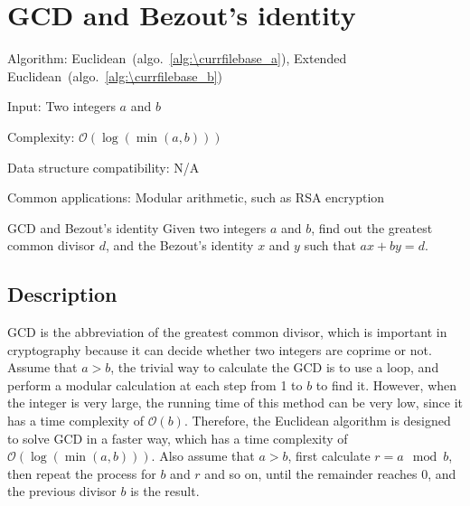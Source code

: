 \documentclass[catalog.tex]{subfiles}
\begin{document}
\def\pbname{GCD and Bezout’s identity} %

\section{\pbname} 

\begin{overview}
\item [Algorithm:] Euclidean~(algo.~\ref{alg:\currfilebase_a}), Extended Euclidean~(algo.~\ref{alg:\currfilebase_b})
\item [Input:] Two integers $a$ and $b$
\item [Complexity:] $\mathcal{O}(\log(\min(a, b)))$
\item [Data structure compatibility:] N/A
\item [Common applications:] Modular arithmetic, such as RSA encryption
\end{overview}


\begin{problem}{\pbname}
	Given two integers $a$ and $b$, find out the greatest common divisor $d$, and the Bezout's identity $x$ and $y$ such that $ax + by = d$.
\end{problem}


\subsection*{Description}
GCD is the abbreviation of the greatest common divisor, which is important in cryptography because it can decide whether two integers are coprime or not. Assume that $a > b$, the trivial way to calculate the GCD is to use a loop, and perform a modular calculation at each step from 1 to $b$ to find it. However, when the integer is very large, the running time of this method can be very low, since it has a time complexity of $\mathcal{O}(b)$. Therefore, the Euclidean algorithm is designed to solve GCD in a faster way, which has a time complexity of $\mathcal{O}(\log(\min(a, b)))$. Also assume that $a>b$, first calculate $r = a\mod b$, then repeat the process for $b$ and $r$ and so on, until the remainder reaches 0, and the previous divisor $b$ is the result.


\end{document}
